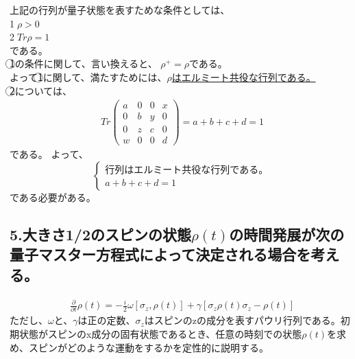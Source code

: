 \documentclass[10pt]{jreport}
\begin{document}
上記の行列が量子状態を表すためな条件としては、\\
\textcircled{\scriptsize 1}$\rho > 0$ \\
\textcircled{\scriptsize 2}$Tr\rho =1 $\\
である。\\
\textcircled{\scriptsize 1}の条件に関して、言い換えると、 $\rho^+ =\rho$である。\\
よって\textcircled{\scriptsize 1}に関して、満たすためには、\underline{$\rho$はエルミート共役な行列である。}\\
\textcircled{\scriptsize 2}については、
\begin{eqnarray}
Tr\left(
    \begin{array}{cccc}
      a & 0 & 0 &x\\
      0 & b & y & 0\\
      0 & z & c & 0 \\
      w & 0& 0&d 
      \end{array} \nonumber
  \right) = a+b+c+d =1
  \end{eqnarray}
  である。
 よって、
\[
\left\{
\begin{array}{ll}
行列はエルミート共役な行列である。 \\
a+b+c+d =1
\end{array}
\right.
\]
である必要がある。

\subsection*{5.大きさ1/2のスピンの状態$\rho(t)$の時間発展が次の量子マスター方程式によって決定される場合を考える。}
\begin{eqnarray}
\frac{\partial}{\partial t}\rho(t) = -\frac{i}{2}\omega [ \sigma_z,\rho(t) ]+\gamma [\sigma_z \rho(t)\sigma_z-\rho(t)]
\end{eqnarray}
ただし、$\omega$と、$\gamma$は正の定数、$\sigma_z$はスピンのzの成分を表すパウリ行列である。初期状態がスピンのx成分の固有状態であるとき、任意の時刻での状態$\rho(t)$を求め、スピンがどのような運動をするかを定性的に説明する。\\
\end{document}
